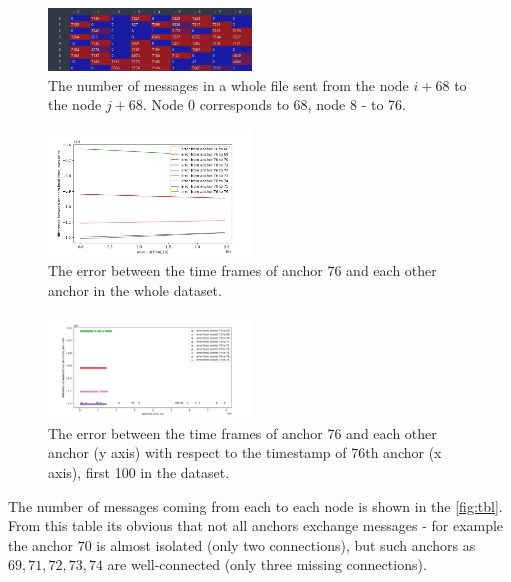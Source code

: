 \documentclass[journal]{IEEEtran}
\begin{document}
\begin{figure}[ht]
    \centering
    \includegraphics[width=0.48\textwidth]{graphics/stat_exchange.png}
    \caption{The number of messages in a whole file sent from the node $i+68$ to the node $j+68$. Node 0 corresponds to 68, node 8 - to 76.}
    \label{fig:tbl}
\end{figure}
\begin{figure}[ht]
    \centering
    \includegraphics[width=0.48\textwidth]{graphics/errors.png}
    \caption{The error between the time frames of anchor 76 and each other anchor in the whole dataset.}
    \label{fig:stat_all}
\end{figure}
\begin{figure}[ht]
    \centering
    \includegraphics[width=0.48\textwidth]{graphics/errors_scaled.png}
    \caption{The error between the time frames of anchor 76 and each other anchor (y axis) with respect to the timestamp of 76th anchor (x axis), first 100 in the dataset.}
    \label{fig:stat_cropped}
\end{figure}

The number of messages coming from each to each node is shown in the \autoref{fig:tbl}. From this table its obvious that not all anchors exchange messages - for example the anchor $70$ is almost isolated (only two connections), but such anchors as $69, 71, 72 ,73, 74$ are well-connected (only three missing connections).
\end{document}
